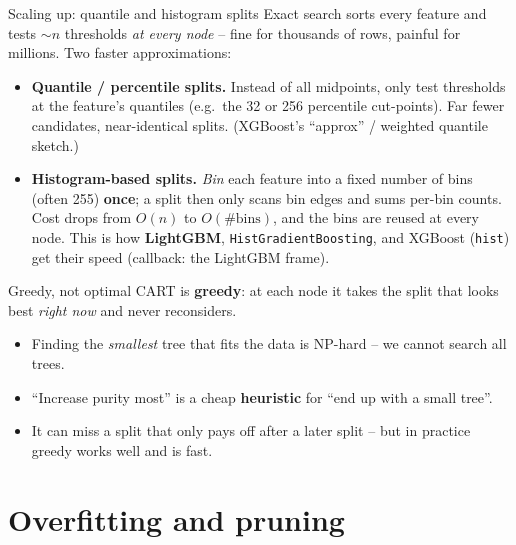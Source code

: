 \documentclass[aspectratio=169]{beamer}
\begin{document}
\begin{frame}{Scaling up: quantile and histogram splits}
  Exact search sorts every feature and tests $\sim n$ thresholds \emph{at every node} --
  fine for thousands of rows, painful for millions. Two faster approximations:
  \vfill
  \begin{itemize}\small
    \item \textbf{Quantile / percentile splits.} Instead of all midpoints, only test
      thresholds at the feature's quantiles (e.g.\ the 32 or 256 percentile cut-points).
      Far fewer candidates, near-identical splits. (XGBoost's ``approx'' / weighted
      quantile sketch.)
    \item \textbf{Histogram-based splits.} \emph{Bin} each feature into a fixed number of
      bins (often 255) \textbf{once}; a split then only scans bin edges and sums per-bin
      counts. Cost drops from $O(n)$ to $O(\#\text{bins})$, and the bins are reused at
      every node. This is how \textbf{LightGBM}, \texttt{HistGradientBoosting}, and
      XGBoost (\texttt{hist}) get their speed (callback: the LightGBM frame).
  \end{itemize}
  \vfill
\end{frame}

\begin{frame}{Greedy, not optimal}
  CART is \textbf{greedy}: at each node it takes the split that looks best \emph{right
  now} and never reconsiders.
  \vfill
  \begin{itemize}
    \item Finding the \emph{smallest} tree that fits the data is NP-hard -- we cannot
      search all trees.
    \item ``Increase purity most'' is a cheap \textbf{heuristic} for ``end up with a
      small tree''.
    \item It can miss a split that only pays off after a later split -- but in practice
      greedy works well and is fast.
  \end{itemize}
\end{frame}

\section{Overfitting and pruning}
\end{document}
